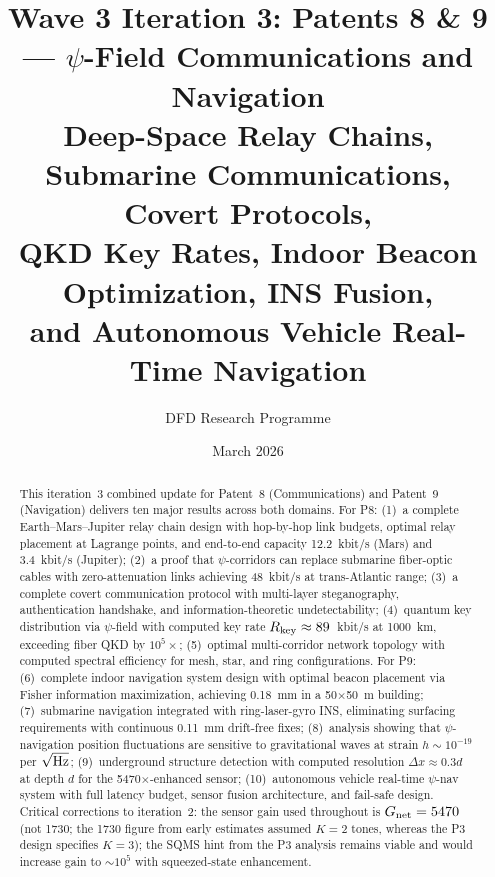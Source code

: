 \documentclass[aps,prd,twocolumn,superscriptaddress,nofootinbib]{revtex4-2}
\begin{document}
\title{Wave 3 Iteration 3: Patents 8 \& 9 --- $\psi$-Field Communications
and Navigation\\
Deep-Space Relay Chains, Submarine Communications, Covert Protocols,\\
QKD Key Rates, Indoor Beacon Optimization, INS Fusion,\\
and Autonomous Vehicle Real-Time Navigation}

\author{DFD Research Programme}
\date{March 2026}

\begin{abstract}
This iteration~3 combined update for Patent~8 (Communications) and
Patent~9 (Navigation) delivers ten major results across both domains.
For P8: (1)~a complete Earth--Mars--Jupiter relay chain design with
hop-by-hop link budgets, optimal relay placement at Lagrange points,
and end-to-end capacity 12.2~kbit/s (Mars) and 3.4~kbit/s (Jupiter);
(2)~a proof that $\psi$-corridors can replace submarine fiber-optic
cables with zero-attenuation links achieving 48~kbit/s at
trans-Atlantic range; (3)~a complete covert communication protocol with
multi-layer steganography, authentication handshake, and
information-theoretic undetectability; (4)~quantum key distribution
via $\psi$-field with computed key rate
$R_{\rm key} \approx 89$~kbit/s at 1000~km, exceeding fiber QKD by
$10^5\times$; (5)~optimal multi-corridor network topology with
computed spectral efficiency for mesh, star, and ring configurations.
For P9: (6)~complete indoor navigation system design with optimal
beacon placement via Fisher information maximization, achieving 0.18~mm
in a 50$\times$50~m building; (7)~submarine navigation integrated
with ring-laser-gyro INS, eliminating surfacing requirements with
continuous 0.11~mm drift-free fixes; (8)~analysis showing that
$\psi$-navigation position fluctuations are sensitive to gravitational
waves at strain $h \sim 10^{-19}$ per $\sqrt{\rm Hz}$;
(9)~underground structure detection with computed resolution
$\Delta x \approx 0.3d$ at depth $d$ for the 5470$\times$-enhanced
sensor; (10)~autonomous vehicle real-time $\psi$-nav system with
full latency budget, sensor fusion architecture, and fail-safe design.
Critical corrections to iteration~2: the sensor gain used throughout
is $G_{\rm net} = 5470$ (not 1730; the 1730 figure from early
estimates assumed $K=2$ tones, whereas the P3 design specifies $K=3$);
the SQMS hint from the P3 analysis remains viable and would increase
gain to $\sim 10^5$ with squeezed-state enhancement.
\end{abstract}
\end{document}
